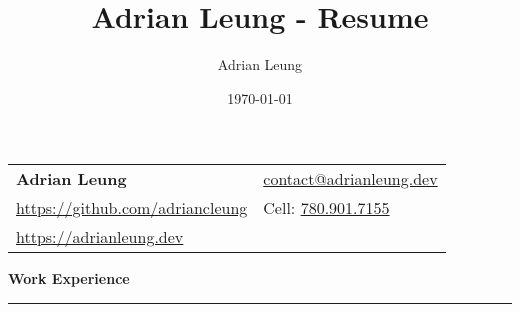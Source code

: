 \documentclass[11pt]{article}
\title{Adrian Leung - Resume}
\author{Adrian Leung}
\date{\today}
\begin{document}
\begin{tabularx}{\textwidth}
  {
    >{\raggedright\arraybackslash}X
    >{\raggedleft\arraybackslash}X
  }
  \Large\textbf{Adrian Leung}                                             & \href{mailto:contact@adrianleung.dev}{contact@adrianleung.dev} \\
  \href{https://github.com/adriancleung}{https://github.com/adriancleung} & Cell: \href{tel:780.901.7155}{780.901.7155}                      \\
  \href{https://adrianleung.dev}{https://adrianleung.dev}                 &                                                                  \\
\end{tabularx}
\vspace{-15pt}

\begin{center}
  \textbf{Work Experience}
  \noindent\rule[10pt]{0.9\paperwidth}{0.4pt}
\end{center}
\vspace{-20pt}
\end{document}
